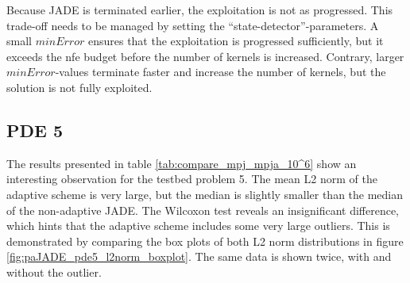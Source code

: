 \documentclass[./\jobname.tex]{subfiles}
\begin{document}
\begin{figure}[H]
	\centering
	\noindent{}
	\label{fig:subexperiment_pde2347_kernels_l2norm}
\end{figure}

Because JADE is terminated earlier, the exploitation is not as progressed. This trade-off needs to be managed by setting the ``state-detector''-parameters. A small $minError$ ensures that the exploitation is progressed sufficiently, but it exceeds the \gls{nfe} budget before the number of kernels is increased. Contrary, larger $minError$-values terminate faster and increase the number of kernels, but the solution is not fully exploited. 

\subsection{PDE 5}

The results presented in table \ref{tab:compare_mpj_mpja_10^6} show an interesting observation for the testbed problem 5. The mean L2 norm of the adaptive scheme is very large, but the median is slightly smaller than the median of the non-adaptive JADE. The Wilcoxon test reveals an insignificant difference, which hints that the adaptive scheme includes some very large outliers. This is demonstrated by comparing the box plots of both L2 norm distributions in figure \ref{fig:paJADE_pde5_l2norm_boxplot}. The same data is shown twice, with and without the outlier. 
\end{document}

